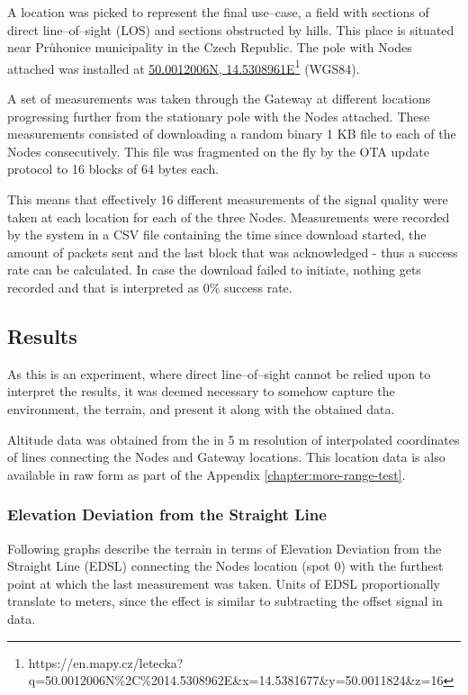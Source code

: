 A location was picked to represent the final use--case, a field with sections of direct line--of--sight (LOS) and sections obstructed by hills. This place is situated near Průhonice municipality in the Czech Republic. The pole with Nodes attached was installed at \href{https://en.mapy.cz/letecka?q=50.0012006N%2C%2014.5308962E&x=14.5381677&y=50.0011824&z=16}{50.0012006N, 14.5308961E}\footnote{https://en.mapy.cz/letecka?q=50.0012006N\%2C\%2014.5308962E\&x=14.5381677\&y=50.0011824\&z=16} (WGS84).

A set of measurements was taken through the Gateway at different locations progressing further from the stationary pole with the Nodes attached. These measurements consisted of downloading a random binary 1 KB file to each of the Nodes consecutively. This file was fragmented on the fly by the OTA update protocol to 16 blocks of 64 bytes each.

This means that effectively 16 different measurements of the signal quality were taken at each location for each of the three Nodes. Measurements were recorded by the system in a CSV file containing the time since download started, the amount of packets sent and the last block that was acknowledged - thus a success rate can be calculated. In case the download failed to initiate, nothing gets recorded and that is interpreted as 0\% success rate.

\subsection{Results}
As this is an experiment, where direct line--of--sight cannot be relied upon to interpret the results, it was deemed necessary to somehow capture the environment, the terrain, and present it along with the obtained data.

Altitude data was obtained from the  in 5 m resolution of interpolated coordinates of lines connecting the Nodes and Gateway locations. This location data is also available in raw form as part of the Appendix \ref{chapter:more-range-test}.

\subsubsection{\label{section:edsl-definition}Elevation Deviation from the Straight Line}
Following graphs describe the terrain in terms of Elevation Deviation from the Straight Line (EDSL) connecting the Nodes location (spot 0) with the furthest point at which the last measurement was taken. Units of EDSL proportionally translate to meters, since the effect is similar to subtracting the offset signal in data.

